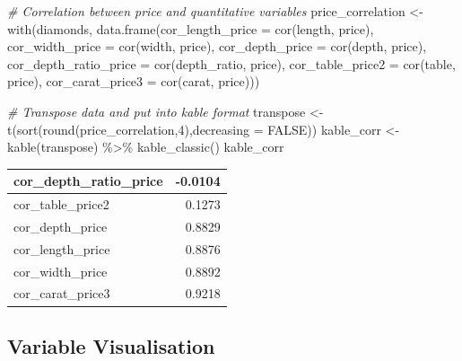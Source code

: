\documentclass[
]{article}
\newenvironment{Shaded}{\begin{snugshade}}{\end{snugshade}}
\newcommand{\AttributeTok}[1]{\textcolor[rgb]{0.77,0.63,0.00}{#1}}
\newcommand{\CommentTok}[1]{\textcolor[rgb]{0.56,0.35,0.01}{\textit{#1}}}
\newcommand{\ConstantTok}[1]{\textcolor[rgb]{0.00,0.00,0.00}{#1}}
\newcommand{\DecValTok}[1]{\textcolor[rgb]{0.00,0.00,0.81}{#1}}
\newcommand{\FunctionTok}[1]{\textcolor[rgb]{0.00,0.00,0.00}{#1}}
\newcommand{\NormalTok}[1]{#1}
\newcommand{\OtherTok}[1]{\textcolor[rgb]{0.56,0.35,0.01}{#1}}
\newcommand{\SpecialCharTok}[1]{\textcolor[rgb]{0.00,0.00,0.00}{#1}}
\begin{document}
\begin{Shaded}
\begin{Highlighting}[]
\CommentTok{\# Correlation between price and quantitative variables}
\NormalTok{price\_correlation }\OtherTok{\textless{}{-}} \FunctionTok{with}\NormalTok{(diamonds,}
     \FunctionTok{data.frame}\NormalTok{(}\AttributeTok{cor\_length\_price =} \FunctionTok{cor}\NormalTok{(length, price), }\AttributeTok{cor\_width\_price =} \FunctionTok{cor}\NormalTok{(width, price), }\AttributeTok{cor\_depth\_price =} \FunctionTok{cor}\NormalTok{(depth, price), }\AttributeTok{cor\_depth\_ratio\_price =} \FunctionTok{cor}\NormalTok{(depth\_ratio, price), }\AttributeTok{cor\_table\_price2 =} \FunctionTok{cor}\NormalTok{(table, price), }\AttributeTok{cor\_carat\_price3 =} \FunctionTok{cor}\NormalTok{(carat, price)))}

\CommentTok{\# Transpose data and put into kable format}
\NormalTok{transpose }\OtherTok{\textless{}{-}} \FunctionTok{t}\NormalTok{(}\FunctionTok{sort}\NormalTok{(}\FunctionTok{round}\NormalTok{(price\_correlation,}\DecValTok{4}\NormalTok{),}\AttributeTok{decreasing =} \ConstantTok{FALSE}\NormalTok{))}
\NormalTok{kable\_corr }\OtherTok{\textless{}{-}} \FunctionTok{kable}\NormalTok{(transpose) }\SpecialCharTok{\%\textgreater{}\%} \FunctionTok{kable\_classic}\NormalTok{() }
\NormalTok{kable\_corr}
\end{Highlighting}
\end{Shaded}

\begin{table}
\centering
\begin{tabular}{l|r}
\hline
cor\_depth\_ratio\_price & -0.0104\\
\hline
cor\_table\_price2 & 0.1273\\
\hline
cor\_depth\_price & 0.8829\\
\hline
cor\_length\_price & 0.8876\\
\hline
cor\_width\_price & 0.8892\\
\hline
cor\_carat\_price3 & 0.9218\\
\hline
\end{tabular}
\end{table}

\hypertarget{variable-visualisation}{%
\subsection{Variable Visualisation}\label{variable-visualisation}}
\end{document}
